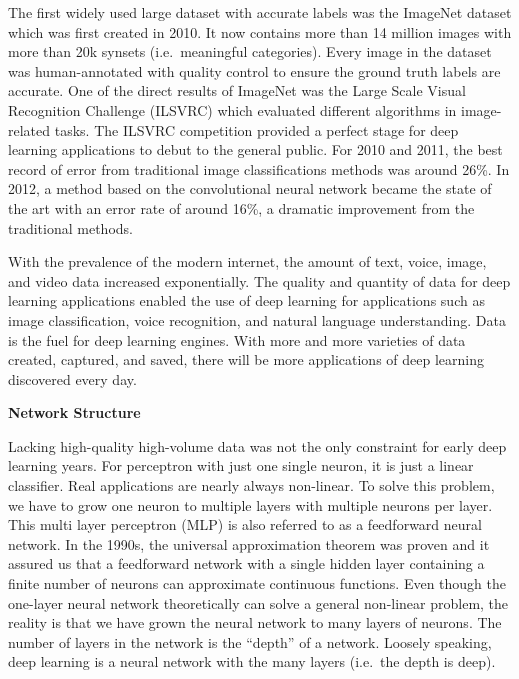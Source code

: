 \documentclass[
  12pt,
]{krantz}
\begin{document}
The first widely used large dataset with accurate labels was the ImageNet dataset which was first created in 2010. It now contains more than 14 million images with more than 20k synsets (i.e.~meaningful categories). Every image in the dataset was human-annotated with quality control to ensure the ground truth labels are accurate. One of the direct results of ImageNet was the Large Scale Visual Recognition Challenge (ILSVRC) which evaluated different algorithms in image-related tasks. The ILSVRC competition provided a perfect stage for deep learning applications to debut to the general public. For 2010 and 2011, the best record of error from traditional image classifications methods was around 26\%. In 2012, a method based on the convolutional neural network became the state of the art with an error rate of around 16\%, a dramatic improvement from the traditional methods.

With the prevalence of the modern internet, the amount of text, voice, image, and video data increased exponentially. The quality and quantity of data for deep learning applications enabled the use of deep learning for applications such as image classification, voice recognition, and natural language understanding. Data is the fuel for deep learning engines. With more and more varieties of data created, captured, and saved, there will be more applications of deep learning discovered every day.

\textbf{Network Structure}

Lacking high-quality high-volume data was not the only constraint for early deep learning years. For perceptron with just one single neuron, it is just a linear classifier. Real applications are nearly always non-linear. To solve this problem, we have to grow one neuron to multiple layers with multiple neurons per layer. This multi layer perceptron (MLP) is also referred to as a feedforward neural network. In the 1990s, the universal approximation theorem was proven and it assured us that a feedforward network with a single hidden layer containing a finite number of neurons can approximate continuous functions. Even though the one-layer neural network theoretically can solve a general non-linear problem, the reality is that we have grown the neural network to many layers of neurons. The number of layers in the network is the ``depth'' of a network. Loosely speaking, deep learning is a neural network with the many layers (i.e.~the depth is deep).
\end{document}
